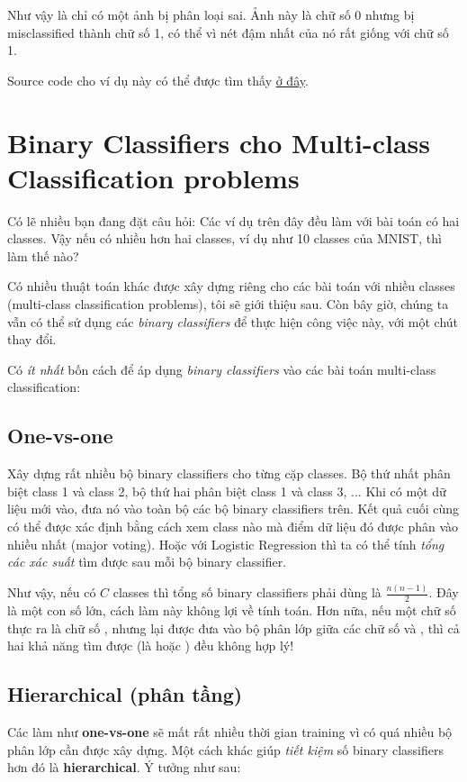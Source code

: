 Như vậy là chỉ có một ảnh bị phân loại sai. Ảnh này là chữ số 0 nhưng bị misclassified thành chữ số 1, có thể vì nét đậm nhất của nó rất giống với chữ số 1.  
 
Source code cho ví dụ này có thể được tìm thấy \href{http://machinelearningcoban.com/assets/LogReg2/LogReg2.ipynb}{ở đây}. 
 
 
\section{Binary Classifiers cho Multi-class Classification problems }
 
Có lẽ nhiều bạn đang đặt câu hỏi: Các ví dụ trên đây đều làm với bài toán có hai classes. Vậy nếu có nhiều hơn hai classes, ví dụ như 10 classes của MNIST, thì làm thế nào? 
 
Có nhiều thuật toán khác được xây dựng riêng cho các bài toán với nhiều classes (multi-class classification problems), tôi sẽ giới thiệu sau. Còn bây giờ, chúng ta vẫn có thể sử dụng các \textit{binary classifiers} để thực hiện công việc này, với một chút thay đổi.  
 
Có \textit{ít nhất} bốn cách để áp dụng \textit{binary classifiers} vào các bài toán multi-class classification: 
 
 
\subsection{One-vs-one}
 
Xây dựng rất nhiều bộ binary classifiers cho từng cặp classes. Bộ thứ nhất phân biệt class 1 và class 2, bộ thứ hai phân biệt class 1 và class 3, ... Khi có một dữ liệu mới vào, đưa nó vào toàn bộ các bộ binary classifiers trên. Kết quả cuối cùng có thể được xác định bằng cách xem class nào mà điểm dữ liệu đó được phân vào nhiều nhất (major voting). Hoặc với Logistic Regression thì ta có thể tính \textit{tổng các xác suất} tìm được sau mỗi bộ binary classifier.  
  
Như vậy, nếu có $C$ classes thì tổng số binary classifiers phải dùng là $\frac{n(n-1)}{2}$. Đây là một con số lớn, cách làm này không lợi về tính toán. Hơn nữa, nếu một chữ số thực ra là chữ số , nhưng lại được đưa vào bộ phân lớp giữa các chữ số  và , thì cả hai khả năng tìm được (là  hoặc ) đều không hợp lý! 
 
 
\subsection{Hierarchical (phân tầng)}
Các làm như \textbf{one-vs-one} sẽ mất rất nhiều thời gian training vì có quá nhiều bộ phân lớp cần được xây dựng. Một cách khác giúp \textit{tiết kiệm} số binary classifiers hơn đó là \textbf{hierarchical}. Ý tưởng như sau: 
 
